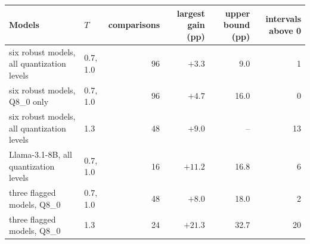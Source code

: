 \begin{tabular}{llrrrr}
\toprule
Models & $T$ & comparisons & largest gain (pp) & upper bound (pp) & intervals above 0 \\
\midrule
six robust models, all quantization levels & 0.7, 1.0 & 96 & $+3.3$ & 9.0 & 1 \\
six robust models, Q8\_0 only & 0.7, 1.0 & 96 & $+4.7$ & 16.0 & 0 \\
six robust models, all quantization levels & 1.3 & 48 & $+9.0$ & -- & 13 \\
Llama-3.1-8B, all quantization levels & 0.7, 1.0 & 16 & $+11.2$ & 16.8 & 6 \\
three flagged models, Q8\_0 & 0.7, 1.0 & 48 & $+8.0$ & 18.0 & 2 \\
three flagged models, Q8\_0 & 1.3 & 24 & $+21.3$ & 32.7 & 20 \\
\bottomrule
\end{tabular}
